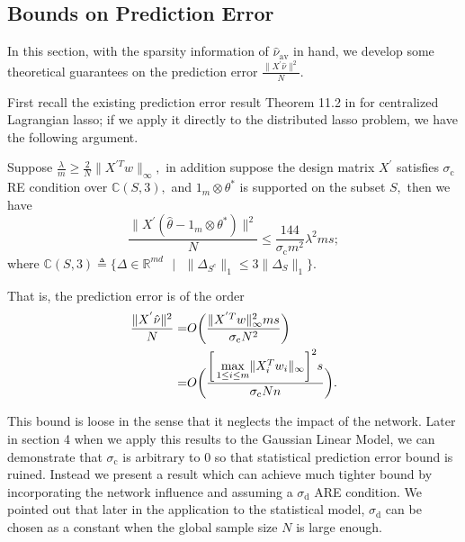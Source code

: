 \documentclass{article}
\theoremstyle{break}
\newcommand{\T}{\theta}
\begin{document}
\subsection{Bounds on Prediction Error}

In this section, with the sparsity information of $\hat{\nu}_{\text{av}}$ in hand, we develop some theoretical guarantees on the prediction error $\frac{\lVert X^{'}\hat{\nu}\rVert^2}{N}.$

First recall the existing prediction error result Theorem 11.2 in \cite{10.5555/2834535} for centralized Lagrangian lasso; if we apply it directly to the distributed lasso problem, we  have the following argument.

Suppose $\frac{\lambda}{m}\geq \frac{2}{N}\lVert X^{'T}w\rVert_{\infty},$ in addition suppose the design matrix $ X^{'}$ satisfies $\sigma_{\text{c}}$ RE condition over $\mathbb{C}(S,3),$ and $1_{m}\otimes\T^*$ is supported on the subset $S,$ then we have
\begin{equation}
   \frac{\lVert X^{'}(\hat{\T}-1_{m}\otimes\T^*)\rVert^2}{N}\leq \frac{144}{\sigma_{\text{c}} m^2}\lambda^2ms;
\end{equation}
where $\mathbb{C}(S,3)\triangleq\{\Delta\in\mathbb{R}^{m d}\text{ }|\text{ }\lVert\Delta_{S^c}\rVert_1\leq 3\lVert\Delta_{S}\rVert_1\}.$

That is, the prediction error is of the order
\begin{align}
    \frac{\lVert X^{'}\hat{\nu}\rVert^2}{N}
    =&O\bigg(\frac{\lVert X^{'T}w\rVert_{\infty}^2ms}{\sigma_{\text{c}}N^2}\bigg)\notag\\
    =&O\bigg(\frac{\bigg[\max\limits_{1\leq i\leq m}\lVert X_i^T w_i\rVert_{\infty}\bigg]^2s}{\sigma_{\text{c}}Nn}\bigg).
\end{align}

This bound is loose in the sense that it neglects the impact of the network. Later in section 4 when we apply this results to the Gaussian Linear Model, we can demonstrate that $\sigma_{\text{c}}$ is arbitrary to 0 so that statistical prediction error bound is ruined. Instead we present a result which can achieve much tighter bound by incorporating the network influence and assuming a $\sigma_{\text{d}}$ ARE condition. We pointed out that later in the application to the statistical model, $\sigma_{\text{d}}$ can be chosen as a constant when the global sample size $N$ is large enough.
\end{document}
